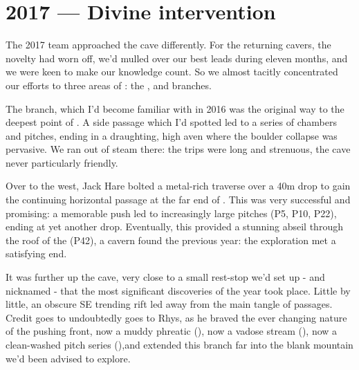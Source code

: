 \section{2017 --- Divine intervention}
The 2017 team approached the cave differently. For the returning cavers, the novelty had worn off, we'd mulled over our best leads during eleven months, and we were keen to make our knowledge count. So we almost tacitly concentrated our efforts to three areas of : the ,  and  branches.

The  branch, which I'd become familiar with in 2016 was the original way to the deepest point of . A side passage which I'd spotted led to a series of chambers and pitches, ending in a draughting, high aven where the boulder collapse was pervasive. We ran out of steam there: the trips were long and strenuous, the cave never particularly friendly.

Over to the west, Jack Hare bolted a metal-rich traverse over a 40m drop to gain the continuing horizontal passage at the far end of . This was very successful and promising: a memorable push led to increasingly large pitches (P5, P10, P22), ending at yet another drop. Eventually, this provided a stunning abseil through the roof of the  (P42), a cavern found the previous year: the exploration met a satisfying end.

It was further up the cave, very close to a small rest-stop we'd set up - and nicknamed - that the most significant discoveries of the year took place. Little by little, an obscure SE trending rift led away from the main tangle of passages. Credit goes to undoubtedly goes to Rhys, as he braved the ever changing nature of the pushing front, now a muddy phreatic (), now a vadose stream (), now a clean-washed pitch series (),and extended this branch far into the blank mountain we'd been advised to explore.  

